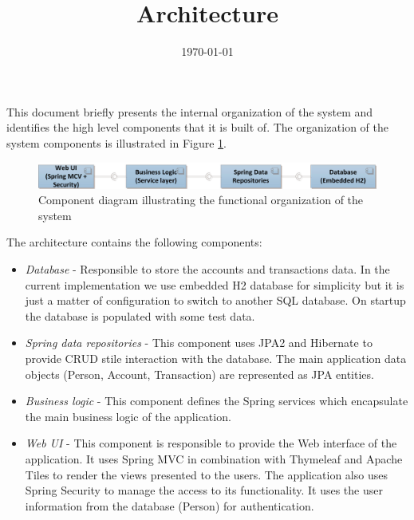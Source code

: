 \documentclass[a4paper, notitlepage]{article}
\begin{document}
\title{Architecture} 
\date{\today}
\maketitle


This document briefly presents the internal organization of the system and identifies the high level components that it is built of. The organization of the system components is illustrated in Figure \ref{org}.
\bigskip

\begin{figure}[H]
  \centering
    \includegraphics[width=1.3\textwidth]{high_level.jpg}
    \caption{Component diagram illustrating the functional organization of the system}
    \label{org}
\end{figure}


\bigskip
The architecture contains the following components:
\begin{itemize}
	\item \textit{Database} - Responsible to store the accounts and transactions data. In the current implementation we use embedded H2 database for simplicity but it is just a matter of configuration to switch to another SQL database. On startup the database is populated with some test data.
	
	\item \textit{Spring data repositories} - This component uses JPA2 and Hibernate to provide CRUD stile interaction with the database. The main application data objects (Person, Account, Transaction) are represented as JPA entities. 
	
	\item \textit{Business logic} - This component defines the Spring services which encapsulate the main business logic of the application.
	
	\item \textit{Web UI} - This component is responsible to provide the Web interface of the application. It uses Spring MVC in combination with Thymeleaf and Apache Tiles to render the views presented to the users. The application also uses Spring Security to manage the access to its functionality. It uses the user information from the database (Person) for authentication.
\end{itemize}
\end{document}
